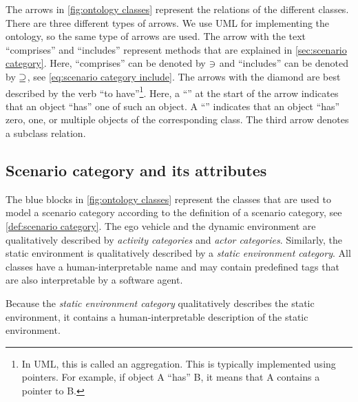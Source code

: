 The arrows in \cref{fig:ontology classes} represent the relations of the different classes. 
There are three different types of arrows. 
We use UML for implementing the ontology, so the same type of arrows are used.
The arrow with the text ``comprises'' and ``includes'' represent methods that are explained in \cref{sec:scenario category}. Here, ``comprises'' can be denoted by $\ni$ and ``includes'' can be denoted by $\supseteq$, see \cref{eq:scenario category include}. 
The arrows with the diamond are best described by the verb ``to have''\footnote{In UML, this is called an aggregation.  This is typically implemented using pointers. For example, if object A ``has'' B, it means that A contains a pointer to B.}. Here, a ``\hasone'' at the start of the arrow indicates that an object ``has'' one of such an object. A ``\hasn'' indicates that an object ``has'' zero, one, or multiple objects of the corresponding class. The third arrow denotes a subclass relation. 



\subsection{Scenario category and its attributes}
\label{sec:domain scenario category}

The blue blocks in \cref{fig:ontology classes} represent the classes that are used to model a scenario category according to the definition of a scenario category, see \cref{def:scenario category}. 
The ego vehicle and the dynamic environment are qualitatively described by \textit{activity categories} and \textit{actor categories}. Similarly, the static environment is qualitatively described by a \textit{static environment category}. All classes have a human-interpretable name and may contain predefined tags that are also interpretable by a software agent.

Because the \textit{static environment category} qualitatively describes the static environment, it contains a human-interpretable description of the static environment.

